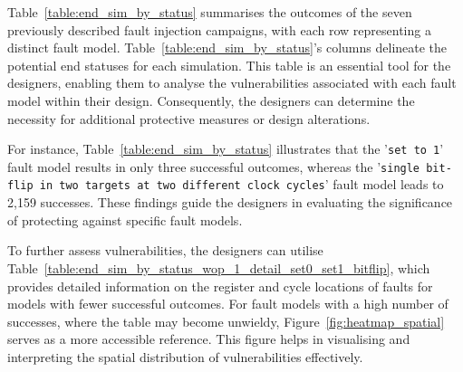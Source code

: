 Table~\ref{table:end_sim_by_status} summarises the outcomes of the seven previously described fault injection campaigns, with each row representing a distinct fault model. Table~\ref{table:end_sim_by_status}'s columns delineate the potential end statuses for each simulation. This table is an essential tool for the designers, enabling them to analyse the vulnerabilities associated with each fault model within their design. Consequently, the designers can determine the necessity for additional protective measures or design alterations.

For instance, Table~\ref{table:end_sim_by_status} illustrates that the '\texttt{set to 1}' fault model results in only three successful outcomes, whereas the '\texttt{single bit-flip in two targets at two different clock cycles}' fault model leads to 2,159 successes. These findings guide the designers in evaluating the significance of protecting against specific fault models.

To further assess vulnerabilities, the designers can utilise Table~\ref{table:end_sim_by_status_wop_1_detail_set0_set1_bitflip}, which provides detailed information on the register and cycle locations of faults for models with fewer successful outcomes. For fault models with a high number of successes, where the table may become unwieldy, Figure~\ref{fig:heatmap_spatial} serves as a more accessible reference. This figure helps in visualising and interpreting the spatial distribution of vulnerabilities effectively.

